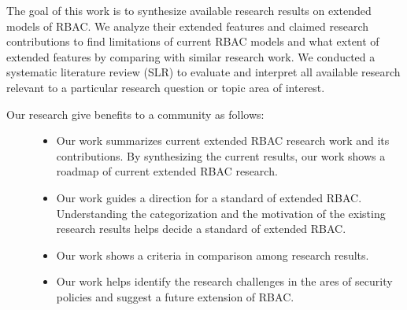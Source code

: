 The goal of this work is to synthesize available research results on extended models of RBAC. We analyze their extended features and claimed research contributions to find limitations of current RBAC models and what extent of extended features by
comparing with similar research work.
We conducted a systematic literature review (SLR) to evaluate and interpret all available research relevant to a particular research question or topic area of interest.
\begin{description}
\item[{Our research give benefits to a community as follows:}]

\begin{itemize}
\item {} 
Our work summarizes current extended RBAC research work and its contributions. By synthesizing the current results, our work shows a roadmap of current extended RBAC research.
\item {} 
Our work guides a direction for a standard of extended RBAC. Understanding the categorization and the motivation of the existing research results helps decide a standard of extended RBAC.
\item {} 
Our work shows a criteria in comparison among research results.
\item {} 
Our work helps identify the research challenges in the ares of security policies and suggest a future extension of RBAC.
\end{itemize}

\end{description}
